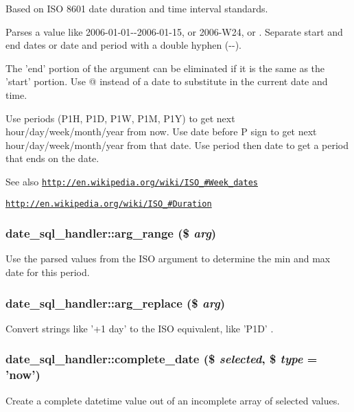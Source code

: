 Based on ISO 8601 date duration and time interval standards.

Parses a value like 2006-\/01-\/01-\/-\/2006-\/01-\/15, or 2006-\/W24, or . Separate start and end dates or date and period with a double hyphen (-\/-\/).

The 'end' portion of the argument can be eliminated if it is the same as the 'start' portion. Use @ instead of a date to substitute in the current date and time.

Use periods (P1H, P1D, P1W, P1M, P1Y) to get next hour/day/week/month/year from now. Use date before P sign to get next hour/day/week/month/year from that date. Use period then date to get a period that ends on the date.

\begin{DoxySeeAlso}{See also}
\href{http://en.wikipedia.org/wiki/ISO_8601#Week_dates}{\tt http://en.wikipedia.org/wiki/ISO\_\#Week\_\-dates} 

\href{http://en.wikipedia.org/wiki/ISO_8601#Duration}{\tt http://en.wikipedia.org/wiki/ISO\_\#Duration} 
\end{DoxySeeAlso}
\hypertarget{classdate__sql__handler_a3c56ad455684b8f9689980d5c1782a2b}{
\subsubsection[{arg\_\-range}]{\setlength{\rightskip}{0pt plus 5cm}date\_\-sql\_\-handler::arg\_\-range (\$ {\em arg})}}
\label{classdate__sql__handler_a3c56ad455684b8f9689980d5c1782a2b}
Use the parsed values from the ISO argument to determine the min and max date for this period. \hypertarget{classdate__sql__handler_a13e12c367362a87b97038a3234957305}{
\subsubsection[{arg\_\-replace}]{\setlength{\rightskip}{0pt plus 5cm}date\_\-sql\_\-handler::arg\_\-replace (\$ {\em arg})}}
\label{classdate__sql__handler_a13e12c367362a87b97038a3234957305}
Convert strings like '+1 day' to the ISO equivalent, like 'P1D' . \hypertarget{classdate__sql__handler_a49b92ba3b97d3f770652c271591e524d}{
\subsubsection[{complete\_\-date}]{\setlength{\rightskip}{0pt plus 5cm}date\_\-sql\_\-handler::complete\_\-date (\$ {\em selected}, \/  \$ {\em type} = {\ttfamily 'now'})}}
\label{classdate__sql__handler_a49b92ba3b97d3f770652c271591e524d}
Create a complete datetime value out of an incomplete array of selected values.

